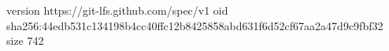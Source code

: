 version https://git-lfs.github.com/spec/v1
oid sha256:44edb531c134198b4cc40ffc12b8425858abd631f6d52cf67aa2a47d9c9fbf32
size 742
